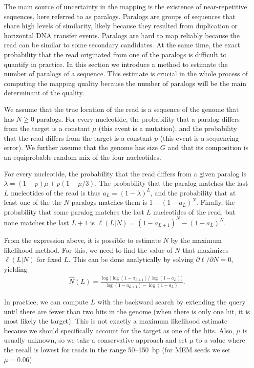 \documentclass[english]{article}
\begin{document}
The main source of uncertainty in the mapping is the existence of
near-repetitive sequences, here referred to as paralogs. Paralogs are
groups of sequences that share high levels of similarity, likely because
they resulted from duplication or horizontal DNA transfer events. Paralogs
are hard to map reliably because the read can be similar to some secondary
candidates. At the same time, the exact probability that the read
originated from one of the paralogs is difficult to quantify in practice.
In this section we introduce a method to estimate the number of paralogs
of a sequence. This estimate is crucial in the whole process of computing
the mapping quality because the number of paralogs will be the main
determinant of the quality.

We assume that the true location of the read is a sequence of the genome
that has $N \geq 0$ paralogs. For every nucleotide, the probability that a
paralog differs from the target is a constant $\mu$ (this event is a
mutation), and the probability that the read differs from the target is a
constant $p$ (this event is a sequencing error). We further assume that
the genome has size $G$ and that its composition is an equiprobable random
mix of the four nucleotides.

For every nucleotide, the probability that the read differs from a given
paralog is $\lambda = (1-p)\mu + p(1-\mu/3)$. The probability that the
paralog matches the last $L$ nucleotides of the read is thus $a_L =
(1-\lambda)^L$, and the probability that at least one of the the $N$
paralogs matches them is $1-(1-a_L)^N$. Finally, the probability that
some paralog matches the last $L$ nucleotides of the read, but none
matches the last $L+1$ is $\ell(L|N) = (1-a_{L+1})^N-(1-a_L)^N.$

From the expression above, it is possible to estimate $N$ by the maximum
likelihood method. For this, we need to find the value of $N$ that
maximizes $\ell(L|N)$ for fixed $L$. This can be done analytically by
solving $\partial \ell / \partial N = 0$, yielding
\begin{align}
\label{eq_mle}
\hat{N}(L) =\frac{ \log \big( \log(1-a_{L+1}) / \log(1-a_L) \big)} {
\log(1-a_{L+1}) - \log(1-a_L) }.
\end{align}

In practice, we can compute $L$ with the backward search by extending the
query until there are fewer than two hits in the genome (when there is
only one hit, it is most likely the target). This is not exactly a maximum
likelihood estimate because we should specifically account for the target
as one of the hits. Also, $\mu$ is usually unknown, so we take a
conservative approach and set $\mu$ to a value where the recall is lowest
for reads in the range 50--150~bp (for MEM seeds we set $\mu = 0.06$).
\end{document}
